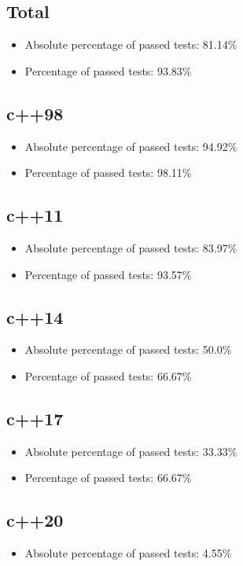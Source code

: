\documentclass{article}
\begin{document}
\subsection{Total}\begin{itemize}\item Absolute percentage of passed tests: 81.14\%

\item Percentage of passed tests: 
93.83\%\end{itemize}\subsection{c++98}\begin{itemize}\item Absolute percentage of passed tests: 94.92\%

\item Percentage of passed tests: 98.11\%\end{itemize}\subsection{c++11}\begin{itemize}\item Absolute percentage of passed tests: 83.97\%

\item Percentage of passed tests: 93.57\%\end{itemize}\subsection{c++14}\begin{itemize}\item Absolute percentage of passed tests: 50.0\%

\item Percentage of passed tests: 66.67\%\end{itemize}\subsection{c++17}\begin{itemize}\item Absolute percentage of passed tests: 33.33\%

\item Percentage of passed tests: 66.67\%\end{itemize}\subsection{c++20}\begin{itemize}\item Absolute percentage of passed tests: 4.55\%


\end{itemize}
\end{document}
